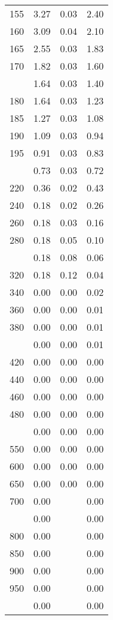 \begin{table}[ht]
\begin{tabular}{lccc}
  155 & 3.27 & 0.03 & 2.40 \\ 
  160 & 3.09 & 0.04 & 2.10 \\ 
  165 & 2.55 & 0.03 & 1.83 \\ 
  170 & 1.82 & 0.03 & 1.60 \\ 
   \addlinespace
175 & 1.64 & 0.03 & 1.40 \\ 
  180 & 1.64 & 0.03 & 1.23 \\ 
  185 & 1.27 & 0.03 & 1.08 \\ 
  190 & 1.09 & 0.03 & 0.94 \\ 
  195 & 0.91 & 0.03 & 0.83 \\ 
   \addlinespace
200 & 0.73 & 0.03 & 0.72 \\ 
  220 & 0.36 & 0.02 & 0.43 \\ 
  240 & 0.18 & 0.02 & 0.26 \\ 
  260 & 0.18 & 0.03 & 0.16 \\ 
  280 & 0.18 & 0.05 & 0.10 \\ 
   \addlinespace
300 & 0.18 & 0.08 & 0.06 \\ 
  320 & 0.18 & 0.12 & 0.04 \\ 
  340 & 0.00 & 0.00 & 0.02 \\ 
  360 & 0.00 & 0.00 & 0.01 \\ 
  380 & 0.00 & 0.00 & 0.01 \\ 
   \addlinespace
400 & 0.00 & 0.00 & 0.01 \\ 
  420 & 0.00 & 0.00 & 0.00 \\ 
  440 & 0.00 & 0.00 & 0.00 \\ 
  460 & 0.00 & 0.00 & 0.00 \\ 
  480 & 0.00 & 0.00 & 0.00 \\ 
   \addlinespace
500 & 0.00 & 0.00 & 0.00 \\ 
  550 & 0.00 & 0.00 & 0.00 \\ 
  600 & 0.00 & 0.00 & 0.00 \\ 
  650 & 0.00 & 0.00 & 0.00 \\ 
  700 & 0.00 &  & 0.00 \\ 
   \addlinespace
750 & 0.00 &  & 0.00 \\ 
  800 & 0.00 &  & 0.00 \\ 
  850 & 0.00 &  & 0.00 \\ 
  900 & 0.00 &  & 0.00 \\ 
  950 & 0.00 &  & 0.00 \\ 
   \addlinespace
1000 & 0.00 &  & 0.00 \\ 
   \bottomrule
\end{tabular}
\end{table}

